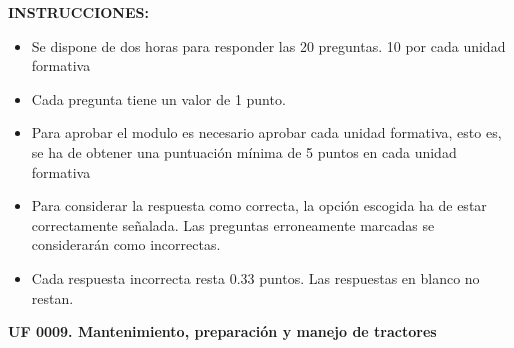 \documentclass[11pt]{exam}
\begin{document}
{\selectfont
\textbf{INSTRUCCIONES:}
\begin{itemize}
    \item Se dispone de dos horas para responder las 20 preguntas. 10 por cada unidad formativa
    \item Cada pregunta tiene un valor de 1 punto.
    \item Para aprobar el modulo es necesario aprobar cada unidad formativa,
      esto es, se ha de obtener una puntuación mínima de 5 puntos en cada unidad
      formativa 
    \item Para considerar la respuesta como correcta, la opción escogida ha de
      estar correctamente señalada. Las preguntas erroneamente marcadas se
      considerarán como incorrectas. 
    \item Cada respuesta incorrecta resta 0.33 puntos. Las respuestas en blanco no restan. 
\end{itemize}
\vspace{1cm}
\textbf{UF 0009. Mantenimiento, preparación y manejo de tractores}
\begin{questions}
\question 

\end{questions}}
\end{document}
